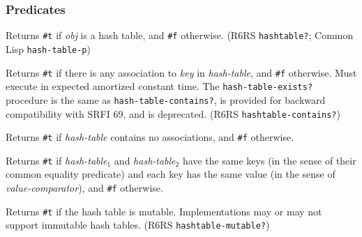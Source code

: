 \subsubsection{Predicates}\label{Predicates}

\begin{entry}{%
  }

  Returns \texttt{\#t} if \emph{obj} is a hash table, and \texttt{\#f}
  otherwise. (R6RS \texttt{hashtable?}; Common Lisp
  \texttt{hash-table-p})
\end{entry}

\begin{entry}{%
  }

  Returns \texttt{\#t} if there is any association to \emph{key} in
  \emph{hash-table}, and \texttt{\#f} otherwise. Must execute in
  expected amortized constant time. The \texttt{hash-table-exists?}
  procedure is the same as \texttt{hash-table-contains?}, is provided
  for backward compatibility with SRFI 69, and is deprecated. (R6RS
  \texttt{hashtable-contains?})
\end{entry}

\begin{entry}{%
  }

  Returns \texttt{\#t} if \emph{hash-table} contains no associations,
  and \texttt{\#f} otherwise.
\end{entry}

\begin{entry}{%
  } 

  Returns \texttt{\#t} if \emph{hash-table$_1$} and
  \emph{hash-table$_2$} have the same keys (in the sense of their
  common equality predicate) and each key has the same value (in the
  sense of \emph{value-comparator}), and \texttt{\#f} otherwise.
\end{entry}

\begin{entry}{%
  }

  Returns \texttt{\#t} if the hash table is mutable. Implementations
  may or may not support immutable hash tables. (R6RS
  \texttt{hashtable-mutable?})
\end{entry}

